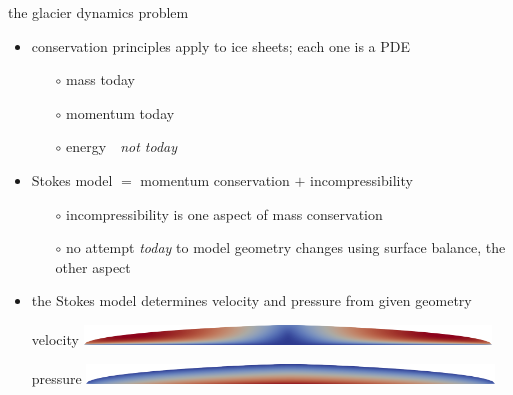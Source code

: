 \documentclass[10pt,hyperref,dvipsnames]{beamer}
\newcommand{\cmark}{\ding{51}}
\newcommand{\xmark}{\ding{55}}
\begin{document}
\begin{frame}{the glacier dynamics problem}

\begin{itemize}
\item conservation principles apply to ice sheets; each one is a PDE
    \begin{itemize}
    \item[$\circ$] mass \hfill \cmark\qquad today
    \item[$\circ$] momentum \hfill \cmark\qquad today
    \item[$\circ$] energy \hfill \xmark\,\, \emph{not today}
    \end{itemize}
\item Stokes model $=$ momentum conservation $+$ incompressibility
    \begin{itemize}
    \item[$\circ$] incompressibility is one aspect of mass conservation
    \item[$\circ$] no attempt \emph{today} to model geometry changes using surface balance, the other aspect
    \end{itemize}
\item \alert{the Stokes model determines velocity and pressure from given geometry}

\bigskip
{\scriptsize velocity} \hfill \includegraphics[width=0.85\textwidth]{figs/speed.png}

\bigskip
{\scriptsize pressure} \hfill \includegraphics[width=0.85\textwidth]{figs/pressure.png}

\bigskip
\end{itemize}
\end{frame}
\end{document}
